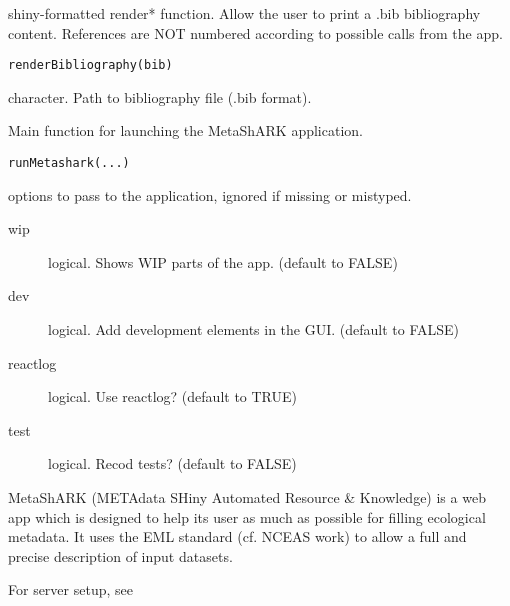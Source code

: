 \documentclass[letterpaper]{book}
\begin{document}
%
\begin{Description}\relax
shiny-formatted render* function. Allow the user to print a .bib bibliography content. References are NOT numbered
according to possible calls from the app.
\end{Description}
%
\begin{Usage}
\begin{verbatim}
renderBibliography(bib)
\end{verbatim}
\end{Usage}
%
\begin{Arguments}
\begin{ldescription}
\item[\code{bib}] character. Path to bibliography file (.bib format).
\end{ldescription}
\end{Arguments}
%
\begin{Description}\relax
Main function for launching the MetaShARK application.
\end{Description}
%
\begin{Usage}
\begin{verbatim}
runMetashark(...)
\end{verbatim}
\end{Usage}
%
\begin{Arguments}
\begin{ldescription}
\item[\code{...}] options to pass to the application, ignored if missing or mistyped.
\begin{description}

\item[wip] logical. Shows WIP parts of the app. (default to FALSE)
\item[dev] logical. Add development elements in the GUI. (default to FALSE)
\item[reactlog] logical. Use reactlog? (default to TRUE)
\item[test] logical. Recod tests? (default to FALSE)

\end{description}

\end{ldescription}
\end{Arguments}
%
\begin{Details}\relax
MetaShARK (METAdata SHiny Automated Resource \& Knowledge) is a web app
which is designed to help its user as much as possible for filling ecological
metadata. It uses the EML standard (cf. NCEAS work) to allow a full and
precise description of input datasets.

For server setup, see 
\end{Details}
\end{document}
